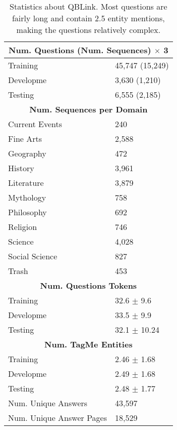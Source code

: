 \begin{table}[t!]
\small
\centering
\begin{tabular}{ll}
  \toprule
  \multicolumn{2}{c}{\textbf{Num. Questions (Num. Sequences) $\times$ 3}}  \\
 \hline
 Training &  45,747 (15,249) \\
 Developme &  3,630 (1,210)   \\
 Testing &  6,555 (2,185) \\
 \hline
 \multicolumn{2}{c}{\textbf{Num. Sequences per Domain}}  \\
 \hline
 Current Events &  240 \\
 Fine Arts &  2,588 \\
 Geography &  472 \\
 History &  3,961 \\
 Literature &  3,879 \\
 Mythology &  758 \\
 Philosophy &  692 \\
 Religion  &  746 \\
 Science &  4,028 \\
 Social Science &  827 \\
 Trash &  453 \\
 \hline
 \multicolumn{2}{c}{\textbf{Num. Questions Tokens}}  \\
 \hline
 Training &  32.6 $\pm$ 9.6 \\
 Developme &  33.5 $\pm$ 9.9 \\
 Testing &  32.1 $\pm$ 10.24 \\
 \hline
 \multicolumn{2}{c}{\textbf{Num. TagMe Entities}}  \\
 \hline
 Training &  2.46 $\pm$ 1.68 \\
 Developme &  2.49 $\pm$ 1.68 \\
 Testing &  2.48 $\pm$ 1.77 \\
 \hline
Num. Unique Answers & 43,597\\
Num. Unique Answer Pages & 18,529\\
 \bottomrule
\end{tabular}
\caption{Statistics about QBLink. Most questions are fairly long and
  contain 2.5 entity mentions, making the questions relatively
  complex.}
\label{tab:data_stats}
\end{table}
